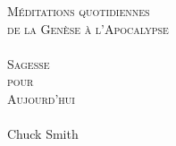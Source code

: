 
\begin{titlepage}
\begin{center}
\mbox{}
\vfill
\textsc{\large Méditations quotidiennes\\de la Genèse à l'Apocalypse}
\\[1.5cm]
\HRule \\[0.4cm]
\textsc{ \Huge Sagesse\\ pour\\[0.4cm] Aujourd'hui}\\[0.4cm]

\HRule \\[1.5cm]
{\LARGE Chuck Smith}\\[1.5cm]
\vfill
\mbox{}
\end{center}
\end{titlepage}
\pagebreak


